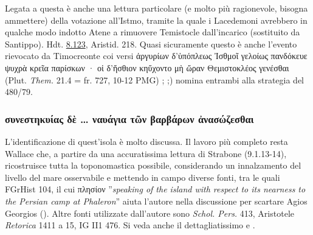 {Legata a questa è anche una lettura particolare (e molto più ragionevole, bisogna ammettere) della votazione all'Istmo, tramite la quale i Lacedemoni avrebbero in qualche modo indotto Atene a rimuovere Temistocle dall'incarico (sostituito da Santippo). Hdt. \href{http://data.perseus.org/citations/urn:cts:greekLit:tlg0016.tlg001.perseus-grc1:8.123}{8.123}, Aristid. 218. Quasi sicuramente questo è anche l'evento rievocato da Timocreonte coi versi \textgreek{ἀργυρίων δ'ὑπόπλεως Ἰσθμοῖ γελοίως πανδόκευε ψυχρὰ  κρεῖα παρίσκων · οἱ δ'ἤσθιον κηὔχοντο μὴ ὤραν Θεμιστοκλέος γενέσθαι }(Plut. \emph{Them.}  21.4 = fr. 727, 10-12 PMG) \cite[279s]{Zadorojnyi2006}; \cite[88]{Funaioli2007};\cite[42]{Fornara1971}) nomina entrambi alla strategia del 480/79.
\subsubsection{\textgreek{συνεστηκυίας δὲ …  ναυάγια τῶν βαρβάρων ἀνασώζεσθαι}}
L'identificazione di quest'isola è molto discussa. Il lavoro più completo resta Wallace che, a partire da una accuratissima lettura di Strabone (9.1.13-14), ricostruisce tutta la toponomastica possibile, considerando un innalzamento del livello del mare osservabile  e mettendo in campo diverse fonti, tra le quali FGrHist 104, il cui  \textgreek{πλησίον} ''\emph{speaking of the island with respect to its nearness to the Persian camp at Phaleron}'' aiuta l'autore nella discussione per scartare Agios Georgios (\cite[295]{Wallace1969}). Altre fonti utilizzate dall'autore sono \emph{Schol. Pers.} 413, Aristotele \emph{Retorica} 1411 a 15, IG II1 476. Si veda anche il dettagliatissimo \cite[692-705 (spec. 700-703)]{Muller1987} e \cite[275]{Asheri2003}. 
}
